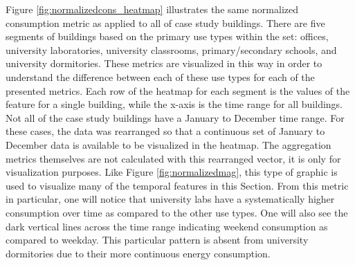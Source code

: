 Figure \ref{fig:normalizedcons_heatmap} illustrates the same normalized consumption metric as applied to all of case study buildings. There are five segments of buildings based on the primary use types within the set: offices, university laboratories, university classrooms, primary/secondary schools, and university dormitories. These metrics are visualized in this way in order to understand the difference between each of these use types for each of the presented metrics. Each row of the heatmap for each segment is the values of the feature for a single building, while the x-axis is the time range for all buildings. Not all of the case study buildings have a January to December time range. For these cases, the data was rearranged so that a continuous set of January to December data is available to be visualized in the heatmap. The aggregation metrics themselves are not calculated with this rearranged vector, it is only for visualization purposes. Like Figure \ref{fig:normalizedmag}, this type of graphic is used to visualize many of the temporal features in this Section. From this metric in particular, one will notice that university labs have a systematically higher consumption over time as compared to the other use types. One will also see the dark vertical lines across the time range indicating weekend consumption as compared to weekday. This particular pattern is absent from university dormitories due to their more continuous energy consumption.